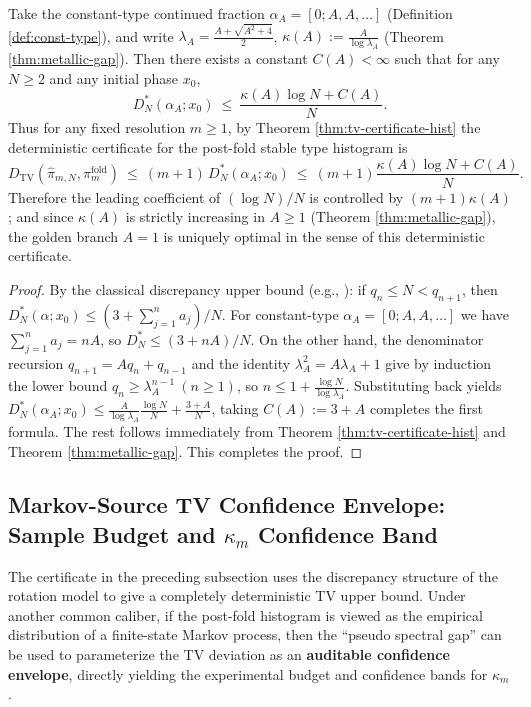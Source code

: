 \begin{corollary}\label{cor:metallic-mean-golden-unique-optimal-tv-constant}
Take the constant-type continued fraction \(\alpha_A=[0;A,A,\dots]\) (Definition \ref{def:const-type}), and write
\(\lambda_A=\frac{A+\sqrt{A^2+4}}{2}\),
\(\kappa(A):=\frac{A}{\log\lambda_A}\) (Theorem \ref{thm:metallic-gap}).
Then there exists a constant \(C(A)<\infty\) such that for any \(N\ge 2\) and any initial phase \(x_0\),
\[
D_N^*(\alpha_A;x_0)\ \le\ \frac{\kappa(A)\log N+C(A)}{N}.
\]
Thus for any fixed resolution \(m\ge 1\), by Theorem \ref{thm:tv-certificate-hist} the deterministic certificate for the post-fold stable type histogram is
\[
D_{\mathrm{TV}}(\hat{\pi}_{m,N},\pi_m^{\mathrm{fold}})
\ \le\ (m+1)\,D_N^*(\alpha_A;x_0)
\ \le\ (m+1)\frac{\kappa(A)\log N+C(A)}{N}.
\]
Therefore the leading coefficient of \((\log N)/N\) is controlled by \((m+1)\kappa(A)\); and since \(\kappa(A)\) is strictly increasing in \(A\ge 1\) (Theorem \ref{thm:metallic-gap}), the golden branch \(A=1\) is uniquely optimal in the sense of this deterministic certificate.
\end{corollary}
\begin{proof}
By the classical discrepancy upper bound (e.g., \cite{KuipersNiederreiter1974}): if \(q_n\le N<q_{n+1}\), then
\(
D_N^*(\alpha;x_0)\le (3+\sum_{j=1}^{n}a_j)/N
\).
For constant-type \(\alpha_A=[0;A,A,\dots]\) we have \(\sum_{j=1}^{n}a_j=nA\), so \(D_N^*\le (3+nA)/N\).
On the other hand, the denominator recursion \(q_{n+1}=Aq_n+q_{n-1}\) and the identity \(\lambda_A^2=A\lambda_A+1\) give by induction the lower bound \(q_n\ge \lambda_A^{n-1}\ (n\ge 1)\), so
\(
n\le 1+\frac{\log N}{\log\lambda_A}
\).
Substituting back yields
\(
D_N^*(\alpha_A;x_0)\le \frac{A}{\log\lambda_A}\frac{\log N}{N}+\frac{3+A}{N}
\), taking \(C(A):=3+A\) completes the first formula.
The rest follows immediately from Theorem \ref{thm:tv-certificate-hist} and Theorem \ref{thm:metallic-gap}. This completes the proof.
\end{proof}

\subsection{Markov-Source TV Confidence Envelope: Sample Budget and \texorpdfstring{$\kappa_m$}{kappa} Confidence Band}\label{subsec:markov-tv-envelope}
The certificate in the preceding subsection uses the discrepancy structure of the rotation model to give a completely deterministic TV upper bound.
Under another common caliber, if the post-fold histogram is viewed as the empirical distribution of a finite-state Markov process, then the ``pseudo spectral gap'' can be used to parameterize the TV deviation as an \textbf{auditable confidence envelope}, directly yielding the experimental budget and confidence bands for \(\kappa_m\).

